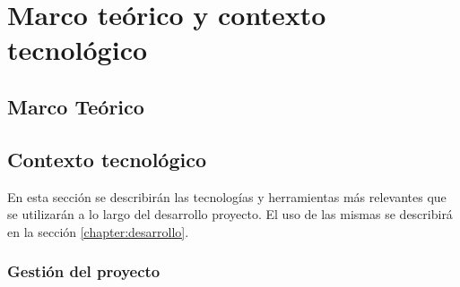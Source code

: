 \chapter{Marco teórico y contexto tecnológico}
\label{chapter:marco}


\section{Marco Teórico}


%
%
%
%


\section{Contexto tecnológico}

    En esta sección se describirán las tecnologías y herramientas más relevantes que se utilizarán a lo
    largo del desarrollo proyecto. El uso de las mismas se describirá en la sección \ref{chapter:desarrollo}.

    \subsection{Gestión del proyecto}
